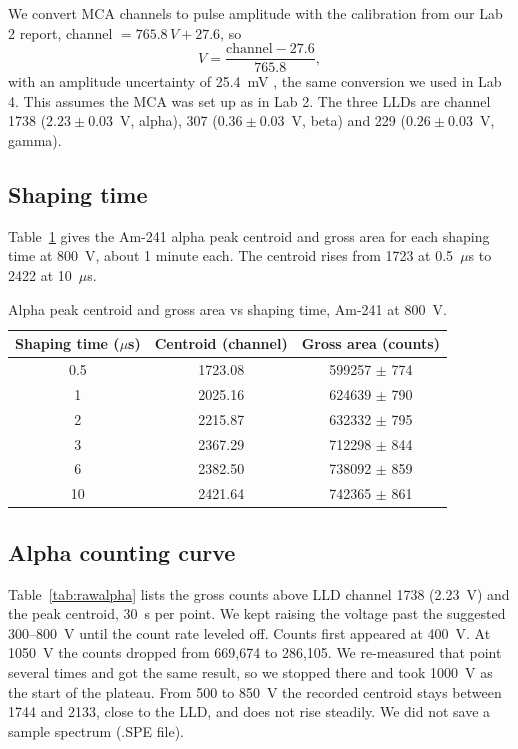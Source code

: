 \documentclass[12pt]{article}
\begin{document}
We convert MCA channels to pulse amplitude with the calibration from our Lab 2 report, channel $= 765.8\,V + 27.6$, so
\begin{equation}
V = \frac{\text{channel} - 27.6}{765.8},
\label{eq:mcacal}
\end{equation}
with an amplitude uncertainty of 25.4~mV \cite{lab2}, the same conversion we used in Lab 4. This assumes the MCA was set up as in Lab 2. The three LLDs are channel 1738 ($2.23 \pm 0.03$~V, alpha), 307 ($0.36 \pm 0.03$~V, beta) and 229 ($0.26 \pm 0.03$~V, gamma).

\subsection{Shaping time}

Table~\ref{tab:rawshape} gives the Am-241 alpha peak centroid and gross area for each shaping time at 800~V, about 1 minute each. The centroid rises from 1723 at 0.5~$\mu$s to 2422 at 10~$\mu$s.

\begin{table}[!htbp]
\centering\small
\begin{tabular}{ccc}
\toprule
\textbf{Shaping time ($\mu$s)} & \textbf{Centroid (channel)} & \textbf{Gross area (counts)} \\
\midrule
0.5 & 1723.08 & 599257 $\pm$ 774 \\
1 & 2025.16 & 624639 $\pm$ 790 \\
2 & 2215.87 & 632332 $\pm$ 795 \\
3 & 2367.29 & 712298 $\pm$ 844 \\
6 & 2382.50 & 738092 $\pm$ 859 \\
10 & 2421.64 & 742365 $\pm$ 861 \\
\bottomrule
\end{tabular}
\caption{Alpha peak centroid and gross area vs shaping time, Am-241 at 800~V.}
\label{tab:rawshape}
\end{table}

\subsection{Alpha counting curve}

Table~\ref{tab:rawalpha} lists the gross counts above LLD channel 1738 (2.23~V) and the peak centroid, 30~s per point. We kept raising the voltage past the suggested 300--800~V \cite{labmanual} until the count rate leveled off. Counts first appeared at 400~V. At 1050~V the counts dropped from 669,674 to 286,105. We re-measured that point several times and got the same result, so we stopped there and took 1000~V as the start of the plateau. From 500 to 850~V the recorded centroid stays between 1744 and 2133, close to the LLD, and does not rise steadily. We did not save a sample spectrum (.SPE file).
\end{document}
